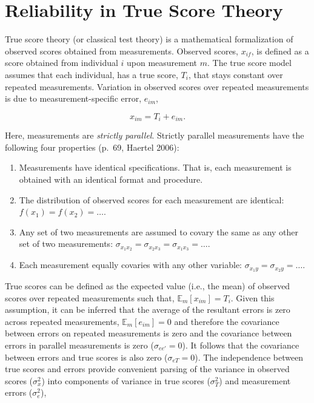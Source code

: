 \documentclass[
  letterpaper,
  DIV=11,
  numbers=noendperiod]{scrreprt}
\providecommand{\tightlist}{%
  \setlength{\itemsep}{0pt}\setlength{\parskip}{0pt}}\usepackage{longtable,booktabs,array}
\begin{document}
\hypertarget{sec-true-score-theory}{%
\section{Reliability in True Score Theory}\label{sec-true-score-theory}}

True score theory (or classical test theory) is a mathematical
formalization of observed scores obtained from measurements. Observed
scores, \(x_{if}\), is defined as a score obtained from individual \(i\)
upon measurement \(m\). The true score model assumes that each
individual, has a true score, \(T_i\), that stays constant over repeated
measurements. Variation in observed scores over repeated measurements is
due to measurement-specific error, \(e_{im}\),

\[
x_{im} = T_i+e_{im}.
\]

Here, measurements are \emph{strictly parallel}. Strictly parallel
measurements have the following four properties (p.~69, Haertel 2006):

\begin{enumerate}
\def\labelenumi{\arabic{enumi}.}
\tightlist
\item
  Measurements have identical specifications. That is, each measurement
  is obtained with an identical format and procedure.
\item
  The distribution of observed scores for each measurement are
  identical: \(f(x_1) = f(x_2) = \ldots\).
\item
  Any set of two measurements are assumed to covary the same as any
  other set of two measurements:
  \(\sigma_{x_1 x_2} = \sigma_{x_2 x_3} = \sigma_{x_1 x_3} = \ldots\).
\item
  Each measurement equally covaries with any other variable:
  \(\sigma_{x_1 y} = \sigma_{x_2 y} = \ldots\).
\end{enumerate}

True scores can be defined as the expected value (i.e., the mean) of
observed scores over repeated measurements such that,
\(\mathbb{E}_m[x_{im}]=T_{i}\). Given this assumption, it can be
inferred that the average of the resultant errors is zero across
repeated measurements, \(\mathbb{E}_m[e_{im}]=0\) and therefore the
covariance between errors on repeated measurements is zero and the
covariance between errors in parallel measurements is zero
(\(\sigma_{e e'}=0\)). It follows that the covariance between errors and
true scores is also zero (\(\sigma_{eT}=0\)). The independence between
true scores and errors provide convenient parsing of the variance in
observed scores (\(\sigma^2_{x}\)) into components of variance in true
scores (\(\sigma_T^2\)) and measurement errors (\(\sigma_{e}^2\)),
\end{document}

